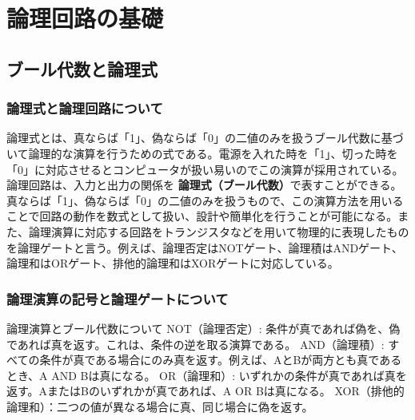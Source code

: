 







\chapter{論理回路の基礎}
\section{ブール代数と論理式}

\subsection{論理式と論理回路について}
論理式とは、真ならば「1」、偽ならば「0」の二値のみを扱うブール代数に基づいて論理的な演算を行うための式である。電源を入れた時を「1」、切った時を「0」に対応させるとコンピュータが扱い易いのでこの演算が採用されている。
論理回路は、入力と出力の関係を
\textbf{論理式（ブール代数）}で表すことができる。真ならば「1」、偽ならば「0」の二値のみを扱うもので、この演算方法を用いることで回路の動作を数式として扱い、設計や簡単化を行うことが可能になる。また、論理演算に対応する回路をトランジスタなどを用いて物理的に表現したものを論理ゲートと言う。例えば、論理否定はNOTゲート、論理積はANDゲート、論理和はORゲート、排他的論理和はXORゲートに対応している。

\subsection{論理演算の記号と論理ゲートについて}
論理演算とブール代数について
NOT（論理否定）: 条件が真であれば偽を、偽であれば真を返す。これは、条件の逆を取る演算である。
AND（論理積）: すべての条件が真である場合にのみ真を返す。例えば、AとBが両方とも真であるとき、A AND Bは真になる。
OR（論理和）: いずれかの条件が真であれば真を返す。AまたはBのいずれかが真であれば、A OR Bは真になる。
XOR（排他的論理和）：二つの値が異なる場合に真、同じ場合に偽を返す。

